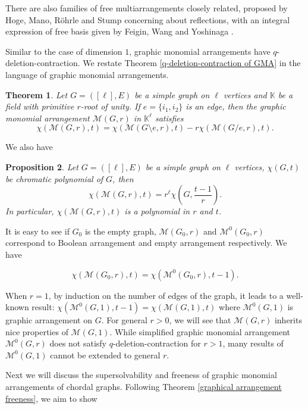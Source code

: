 \documentclass[12pt]{article}
\theoremstyle{plain}%
\newtheorem{theorem}{Theorem}[section]
\newtheorem{proposition}[theorem]{Proposition}
\theoremstyle{definition}
\begin{document}
There are also families of free multiarrangements closely related, proposed by Hoge, Mano, R{\"o}hrle and Stump \cite{hoge2019freeness} concerning about reflections, with an integral expression of free basis given by Feigin, Wang and Yoshinaga \cite{feigin2025integral}.

Similar to the case of dimension $1$, graphic monomial arrangements have $q$-deletion-contraction. We restate Theorem \ref{q-deletion-contraction of GMA} in the language of graphic monomial arrangements.


\begin{theorem}
    Let $G=([\ell], E)$ be a simple graph on $\ell$ vertices and $\mathbb{K}$ be a field with primitive $r$-root of unity. If $e=\{i_1, i_2\}$ is an edge, then the graphic monomial arrangement $\mathcal{M}(G,r)$ in $\mathbb{K}^\ell$ satisfies
    $$\chi(\mathcal{M}(G,r), t)=\chi(\mathcal{M}({G\setminus e},r), t)- r \chi(\mathcal{M}({G/e},r), t).$$
    
\end{theorem}

We also have

\begin{proposition}
    Let $G=([\ell], E)$ be a simple graph on $\ell$ vertices, $\chi(G, t)$ be chromatic polynomial of $G$, then
   $$\chi(\mathcal{M}(G,r),t)=r^\ell\chi(G,\frac{t-1}{r}).$$
    {In particular, $\chi(\mathcal{M}(G,r), t)$ is a polynomial in $r$ and $t$.}
\end{proposition}

It is easy to see if $G_0$ is the empty graph, $\mathcal{M}(G_0,r)$ and $\mathcal{M}^0(G_0,r)$ correspond to Boolean arrangement and empty arrangement respectively. We have 

$$\chi(\mathcal{M}(G_0, r), t)=\chi(\mathcal{M}^0(G_0, r), t-1).$$

When $r=1$, by induction on the number of edges of the graph, it leads to a well-known result: $\chi(\mathcal{M}^0(G, 1), t-1)=\chi(\mathcal{M}(G, 1), t)$ where $\mathcal{M}^0(G, 1)$ is graphic arrangement on $G$. For general $r>0$, we will see that $\mathcal{M}(G, r)$ inherits nice properties of $\mathcal{M}(G, 1)$. While simplified graphic monomial arrangement $\mathcal{M}^0(G,r)$ does not satisfy $q$-deletion-contraction for $r>1$, many results of $\mathcal{M}^0(G,1)$ cannot be extended to general $r$.

Next we will discuss the supersolvability and freeness of graphic monomial arrangements of chordal graphs. Following Theorem \ref{graphical arrangement freeness}, we aim to show
\end{document}

